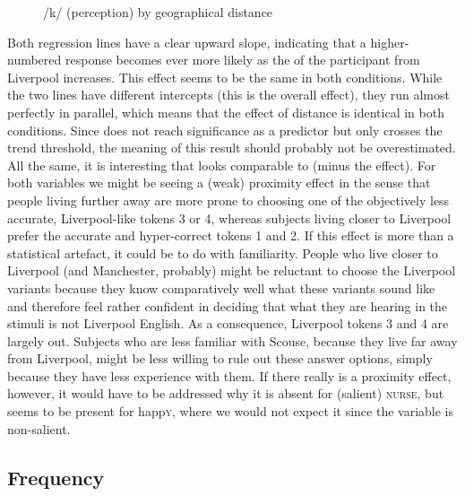 \begin{figure}
	
		\resizebox{.49\linewidth}{!}{} 
	\caption{/k/ (perception) by geographical distance}
	\label{fig.scatter.k.ext.dist}
\end{figure}

Both regression lines have a clear upward slope, indicating that a higher-numbered response becomes ever more likely as the  of the participant from Liverpool increases.
This effect seems to be the same in both conditions.
While the two lines have different intercepts (this is the overall  effect), they run almost perfectly in parallel, which means that the effect of distance is identical in both conditions.
Since  does not reach significance as a predictor but only crosses the trend threshold, the meaning of this result should probably not be overestimated.
All the same, it is interesting that  looks comparable to  (minus the  effect).
For both variables we might be seeing a (weak) proximity effect in the sense that people living further away are more prone to choosing one of the objectively less accurate, Liverpool-like tokens 3 or 4, whereas subjects living closer to Liverpool prefer the accurate and hyper-correct tokens 1 and 2.
If this effect is more than a statistical artefact, it could be to do with familiarity.
People who live closer to Liverpool (and Manchester, probably) might be reluctant to choose the Liverpool variants because they know comparatively well what these variants sound like and therefore feel rather confident in deciding that what they are hearing in the stimuli is not Liverpool English.
As a consequence, Liverpool tokens 3 and 4 are largely out.
Subjects who are less familiar with Scouse, because they live far away from Liverpool, might be less willing to rule out these answer options, simply because they have less experience with them.
If there really is a proximity effect, however, it would have to be addressed why it is absent for (salient) \textsc{nurse},  but seems to be present for happ\textsc{y}, where we would not expect it since the variable is non-salient.

\subsection{Frequency}
\label{sec.perc_res.k.frequency}


